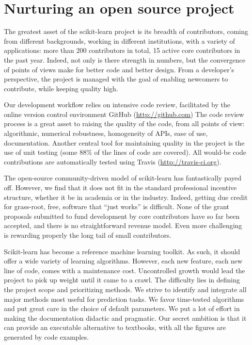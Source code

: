 \documentclass[a4paper]{article}
\begin{document}
\section{Nurturing an open source project}

The greatest asset of the scikit-learn project is its breadth of
contributors, coming from different backgrounds, working in different
institutions, with a variety of applications: more than 200 contributors in
total, 15 active core contributors in the past year. Indeed, not only
is there strength in numbers, but the convergence of points of views
make for better code and better design. From a developer's perspective, the
project is managed with the goal of enabling newcomers to contribute,
while keeping quality high.

Our development workflow relies on intensive code review,
facilitated by the online version control environment GitHub (\url{http://github.com})
The code review process is a great asset to
raising the quality of the code, from all points of view: algorithmic,
numerical robustness, homogeneity of APIs, ease of use, documentation.
Another central tool for maintaining quality in the project is the use of
unit testing (some 88\% of the lines of code are covered).
All would-be code contributions are automatically tested using Travis
(\url{http://travis-ci.org}).

The open-source community-driven model of scikit-learn has fantastically
payed off. However, we find that it does not fit in the standard
professional incentive structure, whether it be in academia or in the
industry. Indeed, getting due credit for grass-root, free, software that
``just works'' is difficult. None of the grant proposals submitted to fund
development by core contributors have so far been accepted, and there is
no straightforward revenue model. Even more challenging is rewarding
properly the long tail of small contributors.

Scikit-learn has become a reference machine learning toolkit. As such, it
should offer a wide variety of learning algorithms. However, each new
feature, each new line of code, comes with a maintenance cost.
Uncontrolled growth would lead the project to pick up weight until it
came to a crawl. The difficulty lies in defining the project scope and
prioritizing methods. We strive to identify and integrate all major
methods most useful for prediction tasks. We favor time-tested
algorithms and put great care in the choice of default parameters. We put
a lot of effort in making the documentation didactic and
pragmatic. Our
secret ambition is that it can provide an executable alternative to
textbooks, with all the figures are generated by code examples.
\end{document}

